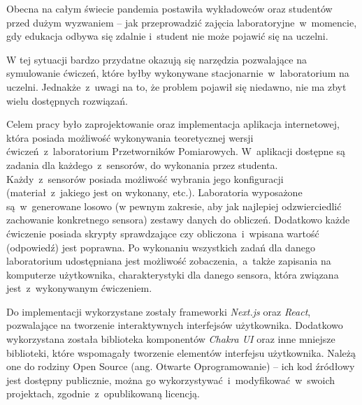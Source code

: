 Obecna na całym świecie pandemia postawiła wykładowców oraz studentów przed dużym wyzwaniem -- jak
przeprowadzić zajęcia laboratoryjne~w~momencie, gdy edukacja odbywa się zdalnie
i~student nie może pojawić się na uczelni.

W tej sytuacji bardzo przydatne okazują się narzędzia pozwalające na symulowanie ćwiczeń, które
byłby wykonywane stacjonarnie~w~laboratorium na uczelni. Jednakże~z~uwagi na to, że
problem pojawił się niedawno, nie ma zbyt wielu dostępnych rozwiązań.

Celem pracy było zaprojektowanie oraz implementacja aplikacja internetowej, która posiada możliwość
wykonywania teoretycznej wersji ćwiczeń~z~laboratorium Przetworników Pomiarowych. W~aplikacji
dostępne są zadania dla każdego~z~sensorów, do wykonania przez studenta. Każdy~z~sensorów posiada
możliwość wybrania jego konfiguracji (materiał~z~jakiego jest on wykonany, etc.). Laboratoria
wyposażone są~w~generowane losowo (w pewnym zakresie, aby jak najlepiej odzwierciedlić zachowanie
konkretnego sensora) zestawy danych do obliczeń. Dodatkowo każde ćwiczenie posiada skrypty
sprawdzające czy obliczona~i~wpisana wartość (odpowiedź) jest poprawna. Po wykonaniu
wszystkich zadań dla danego laboratorium udostępniana jest możliwość zobaczenia,~a~także zapisania
na komputerze użytkownika, charakterystyki dla danego sensora, która związana jest~z~wykonywanym
ćwiczeniem.

Do implementacji wykorzystane zostały frameworki \textit{Next.js} oraz \textit{React}, pozwalające
na tworzenie interaktywnych interfejsów użytkownika. Dodatkowo wykorzystana została biblioteka
komponentów \textit{Chakra UI} oraz inne mniejsze biblioteki, które wspomagały tworzenie elementów
interfejsu użytkownika. Należą one do rodziny Open Source (ang. Otwarte Oprogramowanie) -- ich kod
źródłowy jest dostępny publicznie, można go wykorzystywać~i~modyfikować~w~swoich projektach,
zgodnie~z~opublikowaną licencją.
